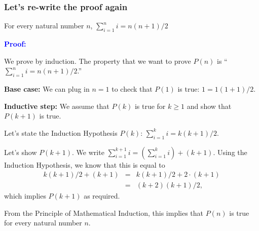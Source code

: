 \begin{frame}\frametitle{Let's re-write the proof again}
  \begin{theorem}
    For every natural number $n$, $\sum_{i=1}^n i = n(n+1)/2$
  \end{theorem}
  {\bf \textcolor{blue}{Proof:}}{\small
    We prove by induction.  The property that we want to prove $P(n)$
    is ``$\sum_{i=1}^n i = n(n+1)/2$.''

    {\bf Base case:} We can plug in $n=1$ to check that $P(1)$ is
    true: $1 = 1(1+1)/2$.

    {\bf Inductive step:} We assume that $P(k)$ is true for $k\geq 1$
    and show that $P(k+1)$ is true.

    Let's state the Induction Hypothesis $P(k)$:
    $ \sum_{i=1}^k i = k(k+1)/2.$

    Let's show $P(k+1)$.  We write
    $ \sum_{i=1}^{k+1} i = \left(\sum_{i=1}^k i\right) + (k+1) .$
    Using the Induction Hypothesis, we know that this is equal to
    \begin{eqnarray*}
      k(k+1)/2 + (k+1) &=& k(k+1)/2 + 2\cdot(k+1)\\
      &=& (k+2)(k+1)/2,
    \end{eqnarray*}
    which implies $P(k+1)$ as required.

    From the Principle of Mathematical Induction, this implies that
    $P(n)$ is true for every natural number $n$.
  }
\end{frame}
